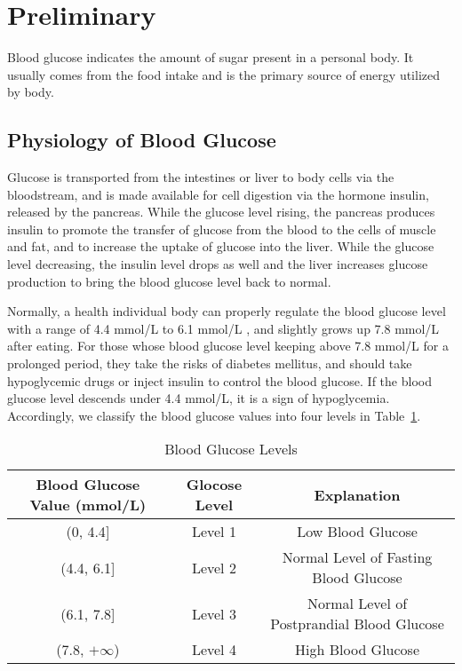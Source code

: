 
\section{Preliminary}
\label{sec:preliminary}
 Blood glucose indicates the amount of sugar present in a personal body. It usually comes from the food intake and is the primary source of energy utilized by body.
 \subsection{Physiology of Blood Glucose }
 Glucose is transported from the intestines or liver to body cells via the bloodstream, and is made available for cell digestion via the hormone insulin, released by the pancreas. While the glucose level rising, the pancreas produces insulin to promote the transfer of glucose from the blood to the cells of muscle and fat, and to increase the uptake of glucose into the liver. While the glucose level decreasing, the insulin level drops as well and the liver increases glucose production  to bring the blood glucose level back to normal.
 
 Normally, a health individual body can properly regulate the blood glucose level with a range of 4.4 mmol/L to 6.1 mmol/L \cite{bib:blood_sugar}, and slightly grows up 7.8 mmol/L after eating. For those whose blood glucose level keeping above 7.8 mmol/L for a prolonged period, they take the risks of diabetes mellitus, and should take hypoglycemic drugs or inject insulin to control the blood glucose. If the blood glucose level descends under 4.4 mmol/L, it is a sign of hypoglycemia. Accordingly, we classify the blood glucose values into four levels in Table~\ref{blood_glucose_levels}. 
 
\begin{table}[]
\centering
\caption{Blood Glucose Levels}
\label{blood_glucose_levels}
\begin{tabular}{|c|c|c|}
\hline
\textbf{Blood Glucose Value (mmol/L)} & \textbf{Glocose Level} & \textbf{Explanation}                      \\ \hline
(0, 4.4{]}                            & Level 1                & Low Blood Glucose                          \\ \hline
(4.4, 6.1{]}                          & Level 2                & Normal Level of Fasting Blood Glucose      \\ \hline
(6.1, 7.8{]}                          & Level 3                & Normal Level of Postprandial Blood Glucose \\ \hline
(7.8, $+\infty$)                               & Level 4                & High Blood Glucose                         \\ \hline
\end{tabular}
\end{table}
 
